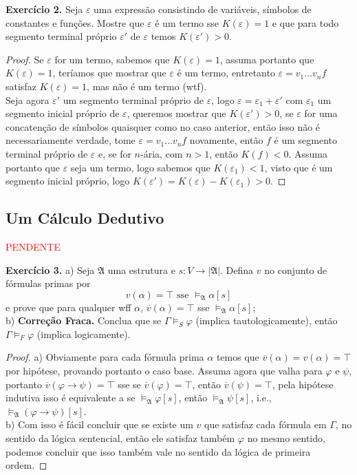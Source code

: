 \documentclass[11pt]{article}
\newcommand{\mf}[1]{\mathfrak{#1}}
\newcommand{\subs}[2]{
    \setcounter{subsection}{#1 - 1}
    \subsection{#2}
    }
\begin{document}
\begin{shaded}
\textbf{Exercício 2.} Seja $\varepsilon$ uma expressão consistindo de variáveis, símbolos de constantes e funções. Mostre que $\varepsilon$ é um termo sse $K(\varepsilon)=1$ e que para todo segmento terminal próprio $\varepsilon'$ de $\varepsilon$ temos $K(\varepsilon')>0$.
\end{shaded}

\begin{proof}
    Se $\varepsilon$ for um termo, sabemos que $K(\varepsilon)=1$, assuma portanto que $K(\varepsilon)=1$, teríamos que mostrar que $\varepsilon$ é um termo, entretanto $\varepsilon=v_1\dots v_nf$ satisfaz $K(\varepsilon)=1$, mas não é um termo (wtf).\\
    Seja agora $\varepsilon'$ um segmento terminal próprio de $\varepsilon$, logo $\varepsilon = \varepsilon_1+\varepsilon'$ com $\varepsilon_1$ um segmento inicial próprio de $\varepsilon$, queremos mostrar que $K(\varepsilon')>0$, se $\varepsilon$ for uma concatenção de símbolos quaisquer como no caso anterior, então isso não é necessariamente verdade, tome $\varepsilon=v_1\dots v_nf$ novamente, então $f$ é um segmento terminal próprio de $\varepsilon$ e, se for $n$-ária, com $n>1$, então $K(f)<0$. Assuma portanto que $\varepsilon$ seja um termo, logo sabemos que $K(\varepsilon_1)<1$, visto que é um segmento inicial próprio, logo $K(\varepsilon')=K(\varepsilon)-K(\varepsilon_1)>0$.
\end{proof}

\subs{4}{Um Cálculo Dedutivo}

\textcolor{red}{PENDENTE}

\begin{shaded}
\textbf{Exercício 3.} a) Seja $\mf{A}$ uma estrutura e $s:V\to|\mf{A}|$. Defina $v$ no conjunto de fórmulas primas por
$$v(\alpha)=\top\text{ sse }\vDash_\mf{A}\alpha[s]$$
e prove que para qualquer wff $\alpha$, $\overline{v}(\alpha)=\top$ sse $\vDash_\mf{A}\alpha[s]$;\\
b) \textbf{Correção Fraca.} Conclua que se $\Gamma\vDash_S\varphi$ (implica tautologicamente), então $\Gamma\vDash_F\varphi$ (implica logicamente).
\end{shaded}

\begin{proof}
    a) Obviamente para cada fórmula prima $\alpha$ temos que $\overline{v}(\alpha)=v(\alpha)=\top$ por hipótese, provando portanto o caso base. Assuma agora que valha para $\varphi$ e $\psi$, portanto $\overline{v}(\varphi\to\psi)=\top$ sse se $\overline{v}(\varphi)=\top$, então $\overline{v}(\psi)=\top$, pela hipótese indutiva isso é equivalente a se $\vDash_\mf{A}\varphi[s]$, então $\vDash_\mf{A}\psi[s]$, i.e., $\vDash_\mf{A}(\varphi\to\psi)[s]$.\\
    b) Com isso é fácil concluir que se existe um $v$ que satisfaz cada fórmula em $\Gamma$, no sentido da lógica sentencial, então ele satisfaz também $\varphi$ no mesmo sentido, podemos concluir que isso também vale no sentido da lógica de primeira ordem.
\end{proof}
\end{document}
